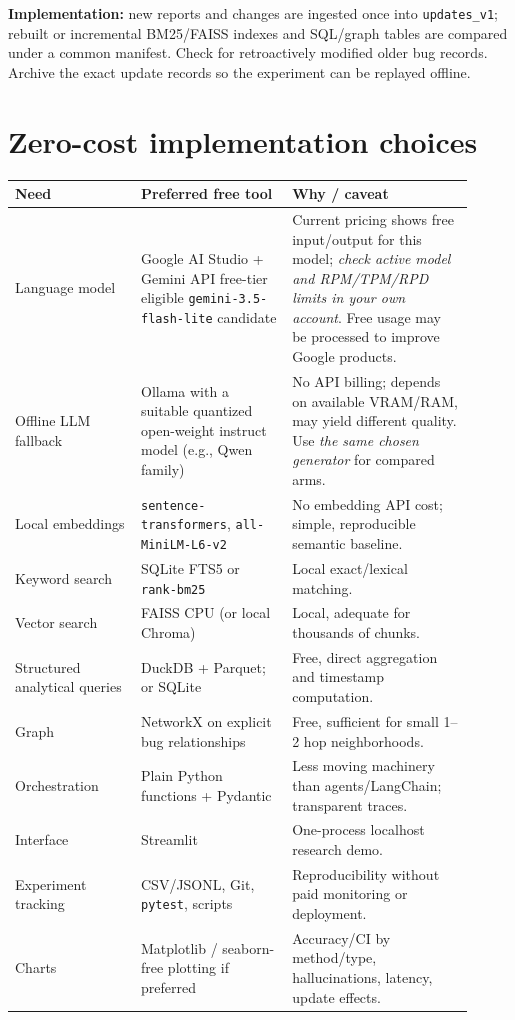 \documentclass[11pt,a4paper]{article}
\begin{document}
\textbf{Implementation:} new reports and changes are ingested once into \texttt{updates\_v1}; rebuilt or incremental BM25/FAISS indexes and SQL/graph tables are compared under a common manifest. Check for retroactively modified older bug records. Archive the exact update records so the experiment can be replayed offline.

\section{Zero-cost implementation choices}
\begin{longtable}{@{}p{0.25\linewidth}p{0.30\linewidth}p{0.36\linewidth}@{}}\toprule
\textbf{Need}&\textbf{Preferred free tool}&\textbf{Why / caveat}\\\midrule\endhead
Language model&Google AI Studio + Gemini API free-tier eligible \texttt{gemini-3.5-flash-lite} candidate\cite{geminipricing}&Current pricing shows free input/output for this model; \emph{check active model and RPM/TPM/RPD limits in your own account}. Free usage may be processed to improve Google products.\\
Offline LLM fallback&Ollama with a suitable quantized open-weight instruct model (e.g., Qwen family)&No API billing; depends on available VRAM/RAM, may yield different quality. Use \emph{the same chosen generator} for compared arms.\\
Local embeddings&\texttt{sentence-transformers}, \texttt{all-MiniLM-L6-v2}&No embedding API cost; simple, reproducible semantic baseline.\\
Keyword search&SQLite FTS5 or \texttt{rank-bm25}&Local exact/lexical matching.\\
Vector search&FAISS CPU (or local Chroma)&Local, adequate for thousands of chunks.\\
Structured analytical queries&DuckDB + Parquet; or SQLite&Free, direct aggregation and timestamp computation.\\
Graph&NetworkX on explicit bug relationships&Free, sufficient for small 1--2 hop neighborhoods.\\
Orchestration&Plain Python functions + Pydantic&Less moving machinery than agents/LangChain; transparent traces.\\
Interface&Streamlit&One-process localhost research demo.\\
Experiment tracking&CSV/JSONL, Git, \texttt{pytest}, scripts&Reproducibility without paid monitoring or deployment.\\
Charts&Matplotlib / seaborn-free plotting if preferred&Accuracy/CI by method/type, hallucinations, latency, update effects.\\\bottomrule
\end{longtable}
\end{document}
